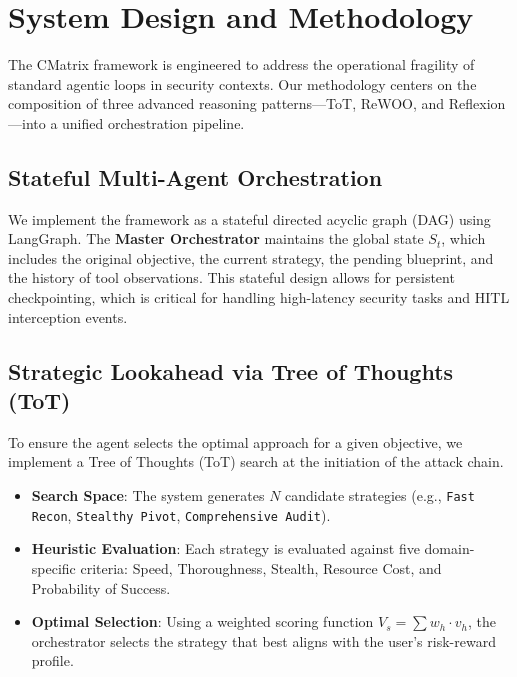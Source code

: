 \section{System Design and Methodology}

The CMatrix framework is engineered to address the operational fragility of standard agentic loops in security contexts. Our methodology centers on the composition of three advanced reasoning patterns—ToT, ReWOO, and Reflexion—into a unified orchestration pipeline.

\subsection{Stateful Multi-Agent Orchestration}
We implement the framework as a stateful directed acyclic graph (DAG) using LangGraph. The \textbf{Master Orchestrator} maintains the global state $S_t$, which includes the original objective, the current strategy, the pending blueprint, and the history of tool observations. This stateful design allows for persistent checkpointing, which is critical for handling high-latency security tasks and HITL interception events.



\subsection{Strategic Lookahead via Tree of Thoughts (ToT)}
To ensure the agent selects the optimal approach for a given objective, we implement a Tree of Thoughts (ToT) search at the initiation of the attack chain. 
\begin{itemize}
    \item \textbf{Search Space}: The system generates $N$ candidate strategies (e.g., \texttt{Fast Recon}, \texttt{Stealthy Pivot}, \texttt{Comprehensive Audit}).
    \item \textbf{Heuristic Evaluation}: Each strategy is evaluated against five domain-specific criteria: Speed, Thoroughness, Stealth, Resource Cost, and Probability of Success.
    \item \textbf{Optimal Selection}: Using a weighted scoring function $V_s = \sum w_h \cdot v_h$, the orchestrator selects the strategy that best aligns with the user's risk-reward profile.
\end{itemize}

